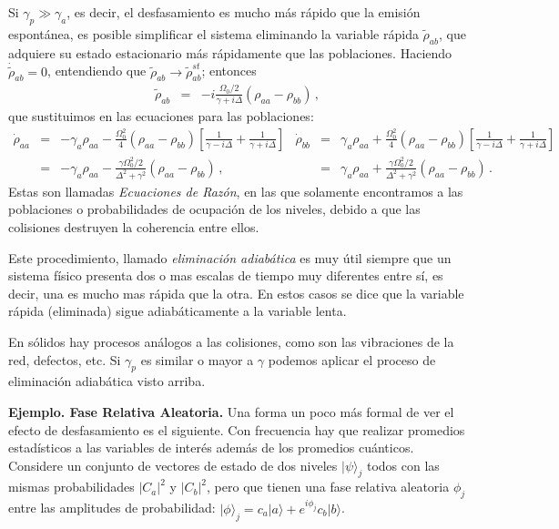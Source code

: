 \documentclass[twocolumn,aps,eqsecnum]{revtex4}
\providecommand{\ket}[1]{\lvert #1 \rangle}
\begin{document}
Si $\gamma_p \gg \gamma_a$, es decir, el desfasamiento es mucho 
m\'as r\'apido que la emisi\'on espont\'anea, es posible simplificar el 
sistema eliminando la variable r\'apida $\tilde{\rho}_{ab}$, que adquiere 
su estado estacionario m\'as r\'apidamente que las poblaciones. 
Haciendo $\dot{\tilde{\rho}}_{ab} =0$, entendiendo que 
$\tilde{\rho}_{ab} \to \tilde{\rho}_{ab}^{st}$; 
entonces 
%
\begin{eqnarray}
\tilde{\rho}_{ab} &=& 
	- i \frac{\Omega_0/2}{\gamma +i\Delta} (\rho_{aa} - \rho_{bb}) \,, 
\end{eqnarray}
que sustituimos en las ecuaciones para las poblaciones: 
%
\begin{subequations}
\begin{eqnarray}
\dot{\rho}_{aa} &=&  -\gamma_a \rho_{aa}  
	- \frac{\Omega_0^2}{4} ( \rho_{aa} - \rho_{bb})  
	\left[ \frac{1}{\gamma -i \Delta} + \frac{1}{\gamma +i\Delta} \right]   
	\nonumber \\ 
&=& -\gamma_a \rho_{aa} 
	- \frac{ \gamma \Omega_0^2/2 }{ \Delta^2 +\gamma^2 } 
	( \rho_{aa} - \rho_{bb}) 	\,, 
\end{eqnarray}
%
\begin{eqnarray}
\dot{\rho}_{bb} &=&  \gamma_a \rho_{aa}  
	+ \frac{\Omega_0^2}{4} ( \rho_{aa} - \rho_{bb})  
	\left[ \frac{1}{\gamma -i \Delta} + \frac{1}{\gamma +i\Delta} \right]    
	\nonumber \\ 
&=& \gamma_a \rho_{aa} 
	+ \frac{ \gamma \Omega_0^2/2 }{ \Delta^2 +\gamma^2 } 
	( \rho_{aa} - \rho_{bb}) 	\,. 
\end{eqnarray}
\end{subequations}
Estas son llamadas \textit{Ecuaciones de Raz\'on}, en las que solamente 
encontramos a las poblaciones o probabilidades de ocupaci\'on de los 
niveles, debido a que las colisiones destruyen la coherencia entre ellos. 

Este procedimiento, llamado \textit{eliminaci\'on adiab\'atica} es muy \'util 
siempre que un sistema f\'isico presenta dos o mas escalas de tiempo 
muy diferentes entre s\'i, es decir, una es mucho mas r\'apida que la otra. 
En estos casos se dice que la variable r\'apida (eliminada) sigue 
adiab\'aticamente a la variable lenta. 

En s\'olidos hay procesos an\'alogos a las colisiones, como son las 
vibraciones de la red, defectos, etc. Si $\gamma_p$ es similar o mayor a 
$\gamma$ podemos aplicar el proceso de eliminaci\'on adiab\'atica visto 
arriba. 

\textbf{Ejemplo. Fase Relativa Aleatoria.}
Una forma un poco m\'as formal de ver el efecto de desfasamiento es el  
siguiente. Con frecuencia hay que realizar promedios estad\'isticos a las 
variables de inter\'es adem\'as de los promedios cu\'anticos. Considere 
un conjunto de vectores de estado de dos niveles $\ket{\psi}_j$ todos 
con las mismas probabilidades $|C_a|^2$ y $|C_b|^2$, pero que tienen 
una fase relativa aleatoria $\phi_j$ entre las amplitudes de probabilidad: 
$\ket{\phi}_j = c_a \ket{a} + e^{i \phi_j} c_b \ket{b}$. 
\end{document}
